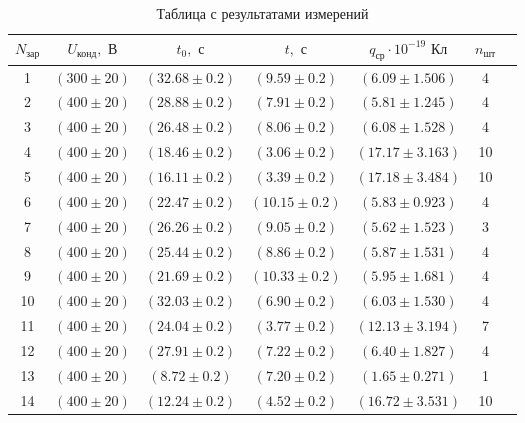 \documentclass{lab}
\begin{document}
\begin{table}[H]
    \centering
    \begin{tabular}{|c|c|c|c|c|c|c|}
        \hline
        $N_\text{зар}$ & $U_\text{конд}, \text{ В}$ & $t_0, \text{ с} $ & $t, \text{ с} $ & $q_\text{ср} \cdot 10^{-19}\text{ Кл}$ & $n_\text{шт}$ \\
        \hline
        1 & $(300 \pm 20)$ & $(32.68 \pm 0.2)$ & $(9.59 \pm 0.2)$  & $(6.09   \pm 1.506)$ & 4    \\
        2 & $(400 \pm 20)$ & $(28.88 \pm 0.2)$ & $(7.91 \pm 0.2)$  & $(5.81   \pm 1.245)$ & 4    \\
        3 & $(400 \pm 20)$ & $(26.48 \pm 0.2)$ & $(8.06 \pm 0.2)$  & $(6.08   \pm 1.528)$ & 4    \\
        4 & $(400 \pm 20)$ & $(18.46 \pm 0.2)$ & $(3.06 \pm 0.2)$  & $(17.17  \pm 3.163)$ & 10   \\
        5 & $(400 \pm 20)$ & $(16.11 \pm 0.2)$ & $(3.39 \pm 0.2)$  & $(17.18  \pm 3.484)$ & 10   \\
        6 & $(400 \pm 20)$ & $(22.47 \pm 0.2)$ & $(10.15 \pm 0.2)$ & $(5.83  \pm 0.923)$ & 4    \\
        7 & $(400 \pm 20)$ & $(26.26 \pm 0.2)$ & $(9.05 \pm 0.2)$  & $(5.62   \pm 1.523)$ & 3    \\
        8 & $(400 \pm 20)$ & $(25.44 \pm 0.2)$ & $(8.86 \pm 0.2)$  & $(5.87   \pm 1.531)$ & 4    \\
        9 & $(400 \pm 20)$ & $(21.69 \pm 0.2)$ & $(10.33 \pm 0.2)$ & $(5.95  \pm 1.681)$ & 4    \\
        10 & $(400 \pm 20)$ & $(32.03 \pm 0.2)$ & $(6.90 \pm 0.2)$  & $(6.03  \pm 1.530)$ & 4    \\
        11 & $(400 \pm 20)$ & $(24.04 \pm 0.2)$ & $(3.77 \pm 0.2)$  & $(12.13 \pm 3.194)$ & 7    \\
        12 & $(400 \pm 20)$ & $(27.91 \pm 0.2)$ & $(7.22 \pm 0.2)$  & $(6.40  \pm 1.827)$ & 4    \\
        13 & $(400 \pm 20)$ & $(8.72 \pm 0.2)$  & $(7.20 \pm 0.2)$  & $(1.65   \pm 0.271)$ & 1    \\
        14 & $(400 \pm 20)$ & $(12.24 \pm 0.2)$ & $(4.52 \pm 0.2)$  & $(16.72 \pm 3.531)$ & 10   \\
        \hline
    \end{tabular}
    \caption{Таблица с результатами измерений}
\end{table}
\end{document}
